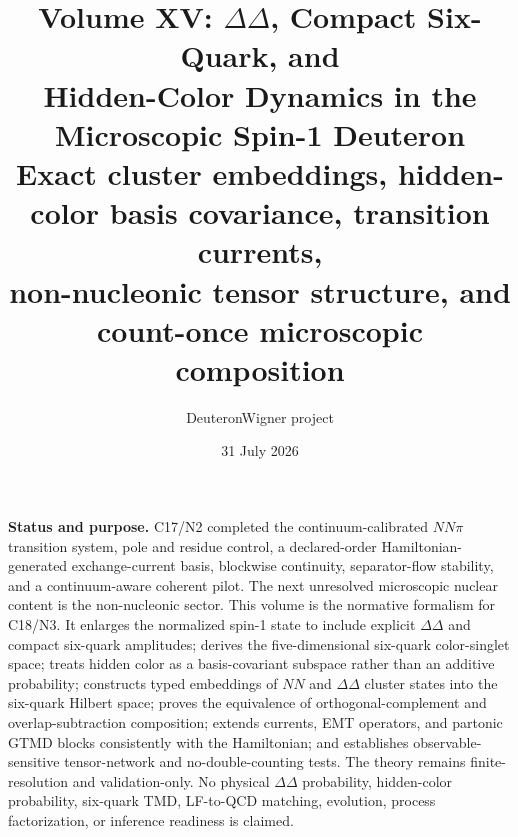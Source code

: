 \documentclass[11pt]{article}
\title{\vspace{-1.0cm}
{\color{navy}\bfseries Volume XV: \(\Delta\Delta\), Compact Six-Quark, and\\[2mm]
Hidden-Color Dynamics in the Microscopic Spin-1 Deuteron}\\[4mm]
\large Exact cluster embeddings, hidden-color basis covariance, transition currents,\\
non-nucleonic tensor structure, and count-once microscopic composition}
\author{DeuteronWigner project}
\date{31 July 2026}
\begin{document}
\maketitle

\begin{center}
\begin{minipage}{0.94\textwidth}
\colorbox{softblue}{\parbox{0.96\textwidth}{
\textbf{Status and purpose.}
C17/N2 completed the continuum-calibrated \(NN\pi\) transition system, pole and residue control, a declared-order Hamiltonian-generated exchange-current basis, blockwise continuity, separator-flow stability, and a continuum-aware coherent pilot.  The next unresolved microscopic nuclear content is the non-nucleonic sector.  This volume is the normative formalism for C18/N3.  It enlarges the normalized spin-1 state to include explicit \(\Delta\Delta\) and compact six-quark amplitudes; derives the five-dimensional six-quark color-singlet space; treats hidden color as a basis-covariant subspace rather than an additive probability; constructs typed embeddings of \(NN\) and \(\Delta\Delta\) cluster states into the six-quark Hilbert space; proves the equivalence of orthogonal-complement and overlap-subtraction composition; extends currents, EMT operators, and partonic GTMD blocks consistently with the Hamiltonian; and establishes observable-sensitive tensor-network and no-double-counting tests.  The theory remains finite-resolution and validation-only.  No physical \(\Delta\Delta\) probability, hidden-color probability, six-quark TMD, LF-to-QCD matching, evolution, process factorization, or inference readiness is claimed.
}}
\end{minipage}
\end{center}
\end{document}
